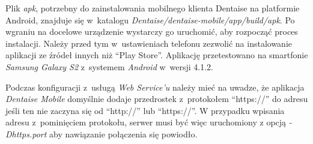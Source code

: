 \documentclass[11pt]{aghdpl}
\begin{document}
Plik \emph{apk}, potrzebny do zainstalowania mobilnego klienta Dentaise na platformie Android, znajduje się w~katalogu \emph{Dentaise/dentaise-mobile/app/build/apk}. Po wgraniu na docelowe urządzenie wystarczy go uruchomić, aby rozpocząć proces instalacji. Należy przed tym w~ustawieniach telefonu zezwolić na instalowanie aplikacji ze źródeł innych niż ``Play Store''. Aplikację przetestowano na smartfonie \emph{Samsung Galaxy S2} z~systemem \emph{Android} w~wersji 4.1.2.

Podczas konfiguracji z~usługą \emph{Web Service'u} należy mieć na uwadze, że aplikacja \emph{Dentaise Mobile} domyślnie dodaje przedrostek z~protokołem ``https://'' do adresu jeśli ten nie zaczyna się od ``http://'' lub ``https://''. W przypadku wpisania adresu z~pominięciem protokołu, serwer musi być więc uruchomiony z opcją \emph{-Dhttps.port} aby nawiązanie połączenia się powiodło.

% 
% 



\end{document}
